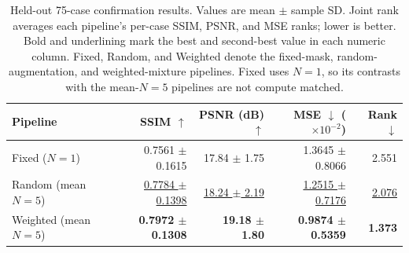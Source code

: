 \begin{table}[t]
  \centering
  \caption{Held-out 75-case confirmation results. Values are mean $\pm$ sample SD. Joint rank averages each pipeline's per-case SSIM, PSNR, and MSE ranks; lower is better. Bold and underlining mark the best and second-best value in each numeric column. Fixed, Random, and Weighted denote the fixed-mask, random-augmentation, and weighted-mixture pipelines. Fixed uses $N=1$, so its contrasts with the mean-$N=5$ pipelines are not compute matched.}
  \label{tab:confirmation-results}
  \small
  \setlength{\tabcolsep}{2.0pt}
  \begin{tabular}{@{}lrrrr@{}}
    \toprule
    Pipeline & SSIM $\uparrow$ & PSNR (dB) $\uparrow$ & MSE $\downarrow$ ($\times10^{-2}$) & Rank $\downarrow$ \\
    \midrule
    Fixed ($N=1$) & 0.7561 $\pm$ 0.1615 & 17.84 $\pm$ 1.75 & 1.3645 $\pm$ 0.8066 & 2.551 \\
    Random (mean $N=5$) & \underline{0.7784 $\pm$ 0.1398} & \underline{18.24 $\pm$ 2.19} & \underline{1.2515 $\pm$ 0.7176} & \underline{2.076} \\
    Weighted (mean $N=5$) & \textbf{0.7972 $\pm$ 0.1308} & \textbf{19.18 $\pm$ 1.80} & \textbf{0.9874 $\pm$ 0.5359} & \textbf{1.373} \\
    \bottomrule
  \end{tabular}
\end{table}
